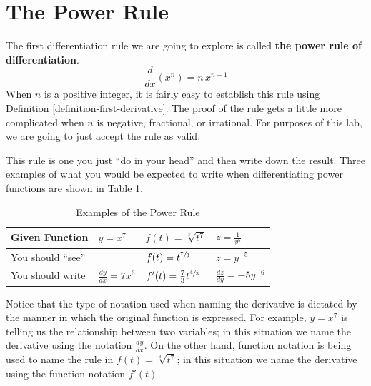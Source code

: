 \documentclass[10pt,oneside,]{book}
\newcommand{\terminology}[1]{\textbf{#1}}
\theoremstyle{plain}
\theoremstyle{definition}
\numberwithin{equation}{section}
\newcommand{\fe}[2]{#1\mathopen{}\left(#2\right)\mathclose{}}
\newcommand{\fd}[1]{#1'}
\newcommand{\lz}[2]{\frac{d#1}{d#2}}
\newcommand{\lzoo}[2]{{\frac{d}{d#1}}{\left(#2\right)}}
\begin{document}
\section[The Power Rule]{The Power Rule}\label{section-power-rule}
The first differentiation rule we are going to explore is called \terminology{the power rule of differentiation}. \begin{equation}\lzoo{x}{x^n}=n\,x^{n-1}\label{men-2}\end{equation} When \(n\) is a positive integer, it is fairly easy to establish this rule using \hyperref[definition-first-derivative]{Definition \ref{definition-first-derivative}}.  The proof of the rule gets a little more complicated when \(n\) is negative, fractional, or irrational.  For purposes of this lab, we are going to just accept the rule as valid.%
\par
This rule is one you just ``do in your head'' and then write down the result.  Three examples of what you would be expected to write when differentiating power functions are shown in \hyperref[table-power-rule]{Table \ref{table-power-rule}}.%
\begin{table}
\centering
\caption{Examples of the Power Rule\label{table-power-rule}}
\begin{tabular}{l|l|l|l}
\toprule
Given Function&\(y=x^7\)&\(\fe{f}{t}=\sqrt[3]{t^7}\)&\(z=\frac{1}{y^5}\)\\
\midrule
You should ``see''&&\(\fe{f}{t}=t^{\sfrac{7}{3}}\)&\(z=y^{-5}\)\\
\midrule
You should write&\(\lz{y}{x}=7x^6\)&\(\fe{\fd{f}}{t}=\frac{7}{3}t^{\sfrac{4}{3}}\)&\(\lz{z}{y}=-5y^{-6}\)\\
\bottomrule
\end{tabular}
\end{table}
\par
Notice that the type of notation used when naming the derivative is dictated by the manner in which the original function is expressed.  For example, \(y=x^7\) is telling us the relationship between two variables; in this situation we name the derivative using the notation \(\lz{y}{x}\).  On the other hand, function notation is being used to name the rule in \(\fe{f}{t}=\sqrt[3]{t^7}\); in this situation we name the derivative using the function notation \(\fe{\fd{f}}{t}\).%
\typeout{************************************************}
\typeout{************************************************}
\end{document}
